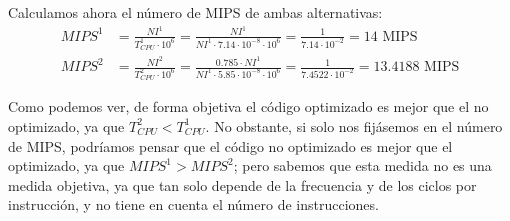 \begin{ejercicio}
    Calculamos ahora el número de MIPS de ambas alternativas:
    \begin{align*}
        MIPS^1 &= \frac{NI^1}{T_{CPU}^1\cdot 10^{6}} = \frac{NI^1}{NI^1 \cdot 7.14 \cdot 10^{-8}\cdot 10^{6}} = \frac{1}{7.14 \cdot 10^{-2}} = 14 \text{ MIPS} \\
        MIPS^2 &= \frac{NI^2}{T_{CPU}^2\cdot 10^{6}} = \frac{0.785\cdot NI^1}{NI^1 \cdot 5.85 \cdot 10^{-8}\cdot 10^{6}} = \frac{1}{7.4522 \cdot 10^{-2}} = 13.4188 \text{ MIPS}
    \end{align*}

    Como podemos ver, de forma objetiva el código optimizado es mejor que el no optimizado, ya que $T_{CPU}^2 < T_{CPU}^1$.
    No obstante, si solo nos fijásemos en el número de MIPS, podríamos pensar que el código no optimizado es mejor que el optimizado, ya que $MIPS^1 > MIPS^2$; pero
    sabemos que esta medida no es una medida objetiva, ya que tan solo depende de la frecuencia y de los ciclos por instrucción, y no tiene en cuenta el número de instrucciones.
\end{ejercicio}

